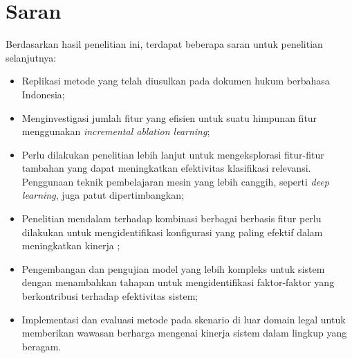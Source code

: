 \section{Saran}
\label{subbab:saran}
Berdasarkan hasil penelitian ini, terdapat beberapa saran untuk penelitian selanjutnya:
\begin{itemize}
\item Replikasi metode yang telah diusulkan pada dokumen hukum berbahasa Indonesia;
\item Menginvestigasi jumlah fitur yang efisien untuk suatu himpunan fitur menggunakan \textit{incremental ablation learning};
\item Perlu dilakukan penelitian lebih lanjut untuk mengeksplorasi fitur-fitur tambahan yang dapat meningkatkan efektivitas klasifikasi relevansi. Penggunaan teknik pembelajaran mesin yang lebih canggih, seperti \textit{deep learning}, juga patut dipertimbangkan;
\item Penelitian mendalam terhadap kombinasi berbagai \reranker{} berbasis fitur perlu dilakukan untuk mengidentifikasi konfigurasi yang paling efektif dalam meningkatkan kinerja \retriever{};
\item Pengembangan dan pengujian model yang lebih kompleks untuk sistem \cascaded{} \ir{} dengan menambahkan tahapan \ranking{} untuk mengidentifikasi faktor-faktor yang berkontribusi terhadap efektivitas sistem;
\item Implementasi dan evaluasi metode pada skenario di luar domain legal untuk memberikan wawasan berharga mengenai kinerja sistem dalam lingkup yang beragam.
\end{itemize}







